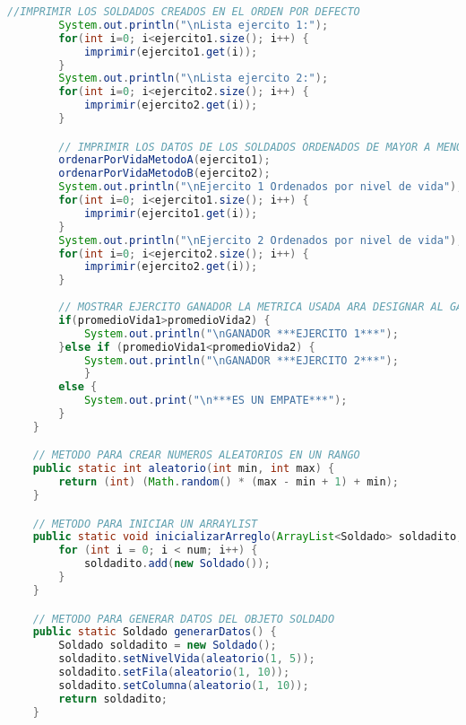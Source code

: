 \documentclass{article}
\begin{document}
\begin{itemize}
\begin{itemize}
\begin{lstlisting}[language=java]
		//IMPRIMIR LOS SOLDADOS CREADOS EN EL ORDEN POR DEFECTO
		System.out.println("\nLista ejercito 1:");
		for(int i=0; i<ejercito1.size(); i++) {
			imprimir(ejercito1.get(i));
		}
		System.out.println("\nLista ejercito 2:");
		for(int i=0; i<ejercito2.size(); i++) {
			imprimir(ejercito2.get(i));
		}

		// IMPRIMIR LOS DATOS DE LOS SOLDADOS ORDENADOS DE MAYOR A MENOR DEPENDIENDO DE SU NIVEL DE VIDA USANDO DOS TIPOS DE ALGORITMO
		ordenarPorVidaMetodoA(ejercito1);
		ordenarPorVidaMetodoB(ejercito2);
		System.out.println("\nEjercito 1 Ordenados por nivel de vida");
		for(int i=0; i<ejercito1.size(); i++) {
			imprimir(ejercito1.get(i));
		}
		System.out.println("\nEjercito 2 Ordenados por nivel de vida");
		for(int i=0; i<ejercito2.size(); i++) {
			imprimir(ejercito2.get(i));
		}
		
		// MOSTRAR EJERCITO GANADOR LA METRICA USADA ARA DESIGNAR AL GANADOR ES POR EL NIVEL DEL PROMEDIO DE VIDA DE CADA EJERCITO
		if(promedioVida1>promedioVida2) {
			System.out.println("\nGANADOR ***EJERCITO 1***");
		}else if (promedioVida1<promedioVida2) {
			System.out.println("\nGANADOR ***EJERCITO 2***");
			}
		else {
			System.out.print("\n***ES UN EMPATE***");
		}
	}

    // METODO PARA CREAR NUMEROS ALEATORIOS EN UN RANGO
    public static int aleatorio(int min, int max) {
        return (int) (Math.random() * (max - min + 1) + min);
    }

    // METODO PARA INICIAR UN ARRAYLIST
    public static void inicializarArreglo(ArrayList<Soldado> soldadito, int num) {
        for (int i = 0; i < num; i++) {
            soldadito.add(new Soldado());
        }
    }

    // METODO PARA GENERAR DATOS DEL OBJETO SOLDADO
    public static Soldado generarDatos() {
        Soldado soldadito = new Soldado();
        soldadito.setNivelVida(aleatorio(1, 5));
        soldadito.setFila(aleatorio(1, 10));
        soldadito.setColumna(aleatorio(1, 10));
        return soldadito;
    }


\end{lstlisting}
\end{itemize}
\end{itemize}
\end{document}
